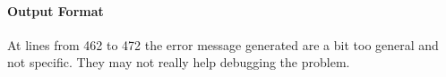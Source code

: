 \paragraph{Output Format}
\begin{itemize}
		At lines from 462 to 472 the error message generated are a bit too general and not specific.
		They may not really help debugging the problem.
\end{itemize}
%
%
